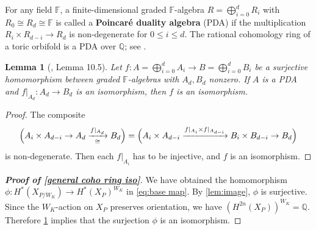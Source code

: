 \documentclass{amsart}
\theoremstyle{plain} \numberwithin{equation}{section}
\newtheorem{lemma}[theorem]{Lemma}
\theoremstyle{definition}
\newcommand{\Q}{\mathbb{Q}}
\newcommand{\F}{\mathbb{F}}
\begin{document}
For any field $\F$, a finite-dimensional graded  $\F$-algebra $R=\bigoplus_{i=0}^dR_i$ with $R_0\cong R_d\cong\F$ is called a \textbf{Poincar\'{e}  duality algebra} (PDA) if the multiplication $R_i\times R_{d-i}\to R_d$ is non-degenerate for $0\leq i\leq d$. The rational cohomology ring of a toric orbifold is a PDA over $\Q$; see \cite[\S 14]{danilovGEOMETRYTORICVARIETIES1978}.

\begin{lemma}[\cite{abeCohomologyRingsRegular2019}, Lemma 10.5]\label{lem:sur is iso}
  Let $f:{A}=\bigoplus_{i=0}^dA_i\to {B}=\bigoplus_{i=0}^dB_i$ be a surjective homomorphism between graded $\F$-algebras with $A_d, B_d$ nonzero. If ${A}$ is a PDA and $f|_{A_d}:A_d\to B_d$ is an isomorphism, then $f$ is an isomorphism.
\end{lemma}
\begin{proof}
  The composite 
  $$\Bigl(A_i\times A_{d-i}\to A_d\xrightarrow[\cong]{f|_{A_d}}B_d\Bigr)=\Bigl(A_i\times A_{d-i}\xrightarrow{f|_{A_i}\times f|_{A_{d-i}}} B_i\times B_{d-i}\to B_d\Bigr)$$
  is non-degenerate. Then each $f|_{A_i}$ has to be injective, and $f$ is an isomorphism.
  \qedhere
\end{proof}

\begin{proof}[\textbf{Proof of \cref{general coho ring iso}}]
We have obtained the  homomorphism $\phi: H^*({X_{P/W_K}})\to H^*(X_{P})^{W_K}$ in \cref{eq:base map}. By \cref{lem:image}, $\phi$ is surjective.
Since the $W_K$-action on $X_P$ preserves orientation, we have
$(H^{2n}(X_{P}))^{W_K}=\Q$. 
Therefore \cref{lem:sur is iso} implies that the surjection $\phi$ is an isomorphism.
\qedhere
\end{proof}
\end{document}
